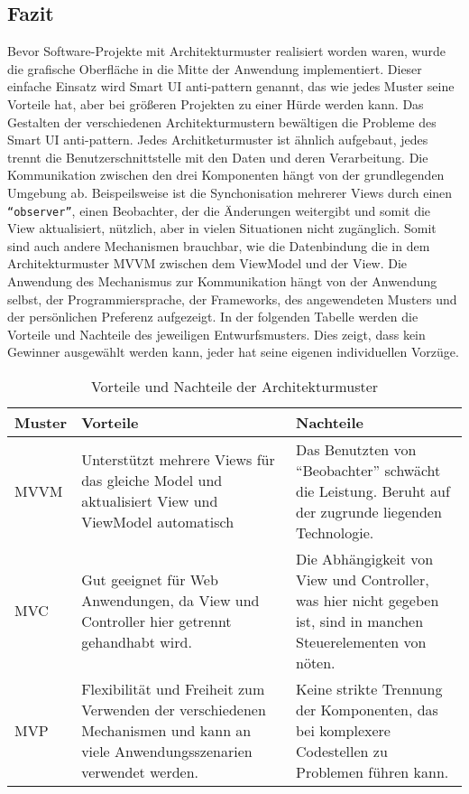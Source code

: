 \subsection{Fazit}
Bevor Software-Projekte mit Architekturmuster realisiert worden waren, wurde die grafische Oberfl\"ache in die Mitte der Anwendung implementiert. Dieser einfache Einsatz wird Smart UI anti-pattern genannt, das wie jedes Muster seine Vorteile hat, aber bei gr\"o\ss{}eren Projekten zu einer H\"urde werden kann. Das Gestalten der verschiedenen Architekturmustern bew\"altigen die Probleme des Smart UI anti-pattern. Jedes Architketurmuster ist \"ahnlich aufgebaut, jedes trennt die Benutzerschnittstelle mit den Daten und deren Verarbeitung. Die Kommunikation zwischen den drei Komponenten h\"angt von der grundlegenden Umgebung ab. Beispeilsweise ist die Synchonisation mehrerer Views durch einen \texttt{\enquote{observer}}, einen Beobachter, der die \"Anderungen weitergibt und somit die View aktualisiert, n\"utzlich, aber in vielen Situationen nicht zug\"anglich. Somit sind auch andere Mechanismen brauchbar, wie die Datenbindung die in dem Architekturmuster \ac{MVVM} zwischen dem ViewModel und der View. Die Anwendung des Mechanismus zur Kommunikation h\"angt von der Anwendung selbst, der Programmiersprache, der Frameworks, des angewendeten Musters und der pers\"onlichen Preferenz aufgezeigt\cite{Bragge2013}. In der folgenden Tabelle\cite{Syromiatnikov2014} werden die Vorteile und Nachteile des jeweiligen Entwurfsmusters. Dies zeigt, dass kein Gewinner ausgew\"ahlt werden kann, jeder hat seine eigenen individuellen Vorz\"uge.
\begin{table}[h]
\centering
\caption{Vorteile und Nachteile der Architekturmuster}
\label{ProConsPattern}
\begin{tabular}{p{2cm}p{7cm}p{7cm}}
\toprule
Muster & Vorteile & Nachteile \\ \midrule
\ac{MVVM}              
& Unterst\"utzt mehrere Views f\"ur das gleiche Model und aktualisiert View und ViewModel automatisch
& 
Das Benutzten von \enquote{Beobachter} schw\"acht die Leistung. Beruht auf der zugrunde liegenden Technologie.  \\ \hline
\ac{MVC}     
 & 
Gut geeignet f\"ur Web Anwendungen, da View und Controller hier getrennt gehandhabt wird.
 &
 Die Abh\"angigkeit von View und Controller, was hier nicht gegeben ist, sind in manchen Steuerelementen von n\"oten.  \\ \hline
\ac{MVP}            
&
Flexibilit\"at und Freiheit zum Verwenden der verschiedenen Mechanismen und kann an viele Anwendungsszenarien verwendet werden. 
&
Keine strikte Trennung der Komponenten, das bei komplexere Codestellen zu Problemen f\"uhren kann.  
\\ \bottomrule
\end{tabular}
\end{table}
